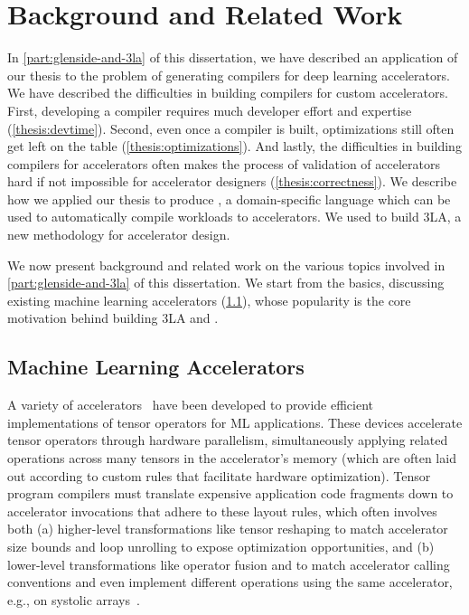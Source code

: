   
\chapter{Background and Related Work}
\label{sec:part1-background}

In \cref{part:glenside-and-3la}
  of this dissertation,
  we have described an application
  of our thesis
  to the problem of
  generating compilers
  for deep learning accelerators.
We have described 
  the difficulties in building
  compilers
  for custom accelerators.
First, developing a compiler
  requires much
  developer effort
  and expertise
  (\cref{thesis:devtime}).
Second,
  even once a compiler is built,
  optimizations still often
  get left on the table
  (\cref{thesis:optimizations}).
And lastly,
  the difficulties in
  building compilers
  for accelerators
  often makes the process
  of validation
  of accelerators
  hard if not impossible
  for accelerator designers
  (\cref{thesis:correctness}).
We describe how
  we applied our thesis
  to produce
  \g,
  a domain-specific language
  which can be used to 
  automatically compile
  workloads to accelerators.
We used \g to build
  3LA, a new methodology
  for accelerator design.

We now present background
  and related work
  on the various topics
  involved in
  \cref{part:glenside-and-3la}
  of this dissertation.
We start from the basics, discussing
  existing
  machine learning accelerators
  (\cref{sec:part1:relatedwork:accelerators}),
  whose popularity
  is the core motivation
  behind building 3LA and \g.

\section{Machine Learning Accelerators}
\label{sec:part1:relatedwork:accelerators}

A variety of accelerators~\cite{
    jouppi2017tpu, chen2016eyeriss, moreau2018vta, markidis2018tensorcore, nvdla,
    genc2021gemmini}
  have been developed 
  to provide efficient implementations
  of tensor operators for ML applications.
These devices accelerate tensor operators 
  through hardware parallelism, 
  simultaneously applying related operations
  across many tensors in the accelerator's memory (which are often laid out according to custom rules that facilitate hardware optimization).
Tensor program compilers must translate
  expensive application code fragments
  down to accelerator invocations that
  adhere to these layout rules,
  which often involves both
  (a) higher-level transformations like
  tensor reshaping to match accelerator size bounds and
  loop unrolling to expose optimization opportunities, and
  (b) lower-level transformations like
  operator fusion and 
  to match accelerator calling conventions and
  even implement different operations
  using the same accelerator,
  e.g., on systolic arrays~\cite{im2col, jia2014semantic}.
  
